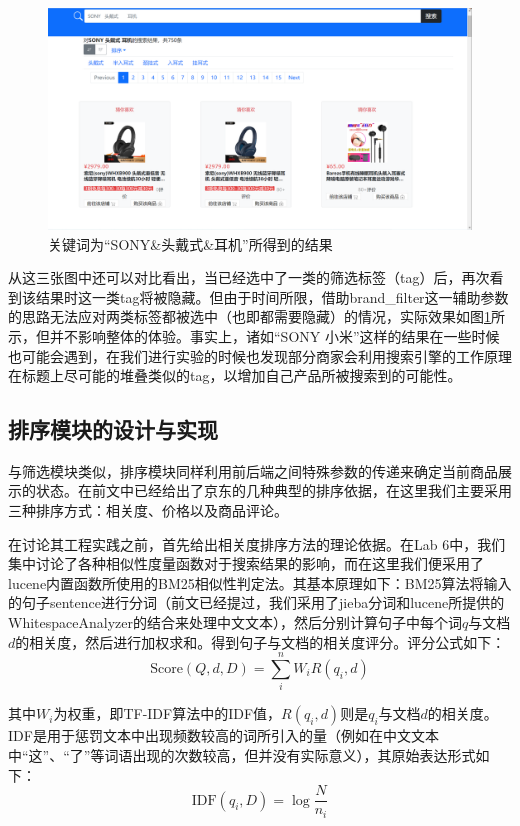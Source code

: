 \documentclass[a4paper,12pt]{article}
\begin{document}
    \begin{figure}[H]
        \centering
        \includegraphics[scale=0.4]{pic/pic9.png}
        \caption{关键词为“SONY\&头戴式\&耳机”所得到的结果}
        \label{fig:9}
    \end{figure}

    从这三张图中还可以对比看出，当已经选中了一类的筛选标签（tag）后，再次看到该结果时这一类tag将被隐藏。但由于时间所限，借助brand\_filter这一辅助参数的思路无法应对两类标签都被选中（也即都需要隐藏）的情况，实际效果如图\ref{fig:9}所示，但并不影响整体的体验。事实上，诸如“SONY 小米”这样的结果在一些时候也可能会遇到，在我们进行实验的时候也发现部分商家会利用搜索引擎的工作原理在标题上尽可能的堆叠类似的tag，以增加自己产品所被搜索到的可能性。

    \subsection{排序模块的设计与实现}

    与筛选模块类似，排序模块同样利用前后端之间特殊参数的传递来确定当前商品展示的状态。在前文中已经给出了京东的几种典型的排序依据，在这里我们主要采用三种排序方式：相关度、价格以及商品评论。

    在讨论其工程实践之前，首先给出相关度排序方法的理论依据。在Lab 6中，我们集中讨论了各种相似性度量函数对于搜索结果的影响，而在这里我们便采用了lucene内置函数所使用的BM25相似性判定法。其基本原理如下：BM25算法将输入的句子sentence进行分词（前文已经提过，我们采用了jieba分词和lucene所提供的WhitespaceAnalyzer的结合来处理中文文本），然后分别计算句子中每个词$q$与文档$d$的相关度，然后进行加权求和。得到句子与文档的相关度评分。评分公式如下：
    \begin{equation}
        \text{Score}(Q,d, D)=\sum\limits_i^n W_iR(q_i, d)
    \end{equation}
            
    其中$W_i$为权重，即TF-IDF算法中的IDF值，$R(q_i, d)$则是$q_i$与文档$d$的相关度。IDF是用于惩罚文本中出现频数较高的词所引入的量（例如在中文文本中“这”、“了”等词语出现的次数较高，但并没有实际意义），其原始表达形式如下：
    \begin{equation}
        \text{IDF}(q_i, D)=\log \frac{N}{n_i}
    \end{equation}
    
\end{document}
